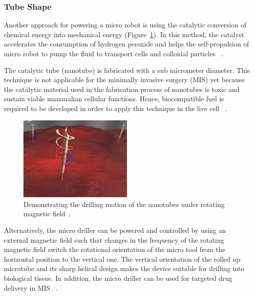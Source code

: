 \documentclass[a4paper,11pt]{article}
\begin{document}
\begin{sloppypar}
\paragraph{}
\subsubsection{Tube Shape}


Another approach for powering a micro robot is using the catalytic conversion of chemical energy
 into mechanical energy (Figure~\ref{nanotube}). In this method, the catalyst accelerates the consumption of hydrogen peroxide
 and helps the self-propulsion of micro robot to pump the fluid to transport cells and colloidal 
particles ~\citep{C2NR32798H}.

The catalytic tube (nanotube) is fabricated with a sub micrometer diameter.
 This technique is not applicable for the minimally invasive surgery (MIS) yet because the catalytic
 material used in the fabrication process of nanotubes is toxic and sustain viable mammalian cellular 
functions. Hence, biocompatible fuel is required to be developed in order to apply this technique in the 
live cell ~\citep{C2NR32798H}.


\begin{figure}
  \begin{center}
    \includegraphics[width=0.5\textwidth]{nanoJet3}
  \caption{Demonstrating the drilling motion of the nanotubes under rotating
 magnetic field~\citep{C2NR32798H}.}
  \label{nanotube}
\end{center}
\end{figure}
Alternatively, the micro driller can be powered and controlled by using an external magnetic field 
such that changes in the frequency of the rotating magnetic field switch the rotational orientation of the 
micro tool from the horizontal position to the vertical one. The vertical orientation of the rolled up microtube 
and its sharp helical design makes the device suitable for drilling into biological tissue. In addition, the micro 
driller can be used for targeted drug delivery in MIS ~\citep{C2NR32798H}. 





\end{sloppypar}
\end{document}
